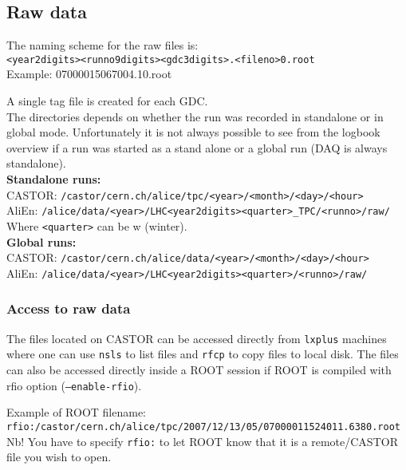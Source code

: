 \documentclass[a4paper,12pt]{article}
\begin{document}
\subsection{Raw data}

The naming scheme for the raw files is:\\
\texttt{<year2digits><runno9digits><gdc3digits>.<fileno>0.root}\\
Example: 07000015067004.10.root

A single tag file is created for each GDC.\\

The directories depends on whether the run was recorded in standalone
or in global mode. Unfortunately it is not always possible to see from
the logbook overview if a run was started as a stand alone or a global
run (DAQ is always standalone).\\


\textbf{Standalone runs:}\\

CASTOR: \texttt{/castor/cern.ch/alice/tpc/<year>/<month>/<day>/<hour>} \\
AliEn: \texttt{/alice/data/<year>/LHC<year2digits><quarter>\_TPC/<runno>/raw/} \\

Where \texttt{<quarter>} can be w (winter).\\


\textbf{Global runs:}\\

CASTOR: \texttt{/castor/cern.ch/alice/data/<year>/<month>/<day>/<hour>}\\
AliEn:  \texttt{/alice/data/<year>/LHC<year2digits><quarter>/<runno>/raw/}

\subsubsection{Access to raw data}

The files located on CASTOR can be accessed directly from
\texttt{lxplus} machines where one can use \texttt{nsls} to list files
and \texttt{rfcp} to copy files to local disk. The files can also be
accessed directly inside a ROOT session if ROOT is compiled with rfio
option (\texttt{--enable-rfio}).

Example of ROOT filename:\\
\texttt{rfio:/castor/cern.ch/alice/tpc/2007/12/13/05/07000011524011.6380.root}\\
Nb! You have to specify \texttt{rfio:} to let ROOT know that it is a
remote/CASTOR file you wish to open.\\
\end{document}
